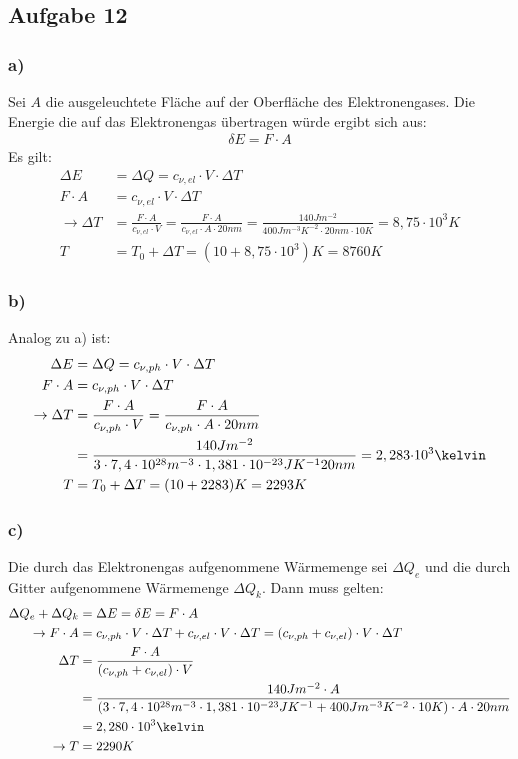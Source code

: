 \subsection*{Aufgabe 12}
\subsubsection*{a)}
Sei $A$ die ausgeleuchtete Fläche auf der Oberfläche des Elektronengases. Die Energie die auf das Elektronengas übertragen würde ergibt sich aus:
\begin{align*}
\delta E = F\cdot A
\end{align*}
Es gilt:
\begin{align*}
\Delta E &= \Delta Q= c_{\nu,el}\cdot V\cdot\Delta T\\
F\cdot A&= c_{\nu,el}\cdot V\cdot\Delta T\\
\rightarrow \Delta T &= \frac{F\cdot A}{c_{\nu,el}\cdot V} = \frac{F\cdot A}{c_{\nu,el}\cdot A\cdot \unit{20}{nm}} =  \frac{\unit{140}{Jm^{-2}}}{\unit{400}{Jm^{-3}K^{-2}}\cdot \unit{20}{nm}\cdot\unit{10}{K}} =8,75\cdot10^3K\\
T&=T_0+\Delta T = (10+8,75\cdot10^3)K = 8760K
\end{align*}

\subsubsection*{b)}
Analog zu a) ist:
\begin{align*}
\Delta E &= \Delta Q= c_{\nu,ph}\cdot V\cdot\Delta T\\
F\cdot A&= c_{\nu,ph}\cdot V\cdot\Delta T\\
\rightarrow \Delta T &= \frac{F\cdot A}{c_{\nu,ph}\cdot V} = \frac{F\cdot A}{c_{\nu,ph}\cdot A\cdot \unit{20}{nm}} \\
&=\frac{\unit{140}{Jm^{-2}}}{3 \cdot 7,4\cdot10^{28}\unit{}{m^{-3}}\cdot1,381\cdot10^{-23}\unit{}{JK^{-1}} \unit{20}{nm}}=
\unit{2,283}{\cdot 10^3}{\kelvin}\\
T&=T_0+\Delta T = (10+2283)K = 2293 K
\end{align*}
\subsubsection*{c)}
Die durch das Elektronengas aufgenommene Wärmemenge sei $\Delta Q_e$ und die durch Gitter aufgenommene Wärmemenge $\Delta Q_k$. Dann muss gelten:
\begin{align*}
\Delta Q_e+\Delta Q_k &= \Delta E = \delta E = F\cdot A\\
\rightarrow F\cdot A &=c_{\nu,ph}\cdot V\cdot\Delta T+c_{\nu,el}\cdot V\cdot\Delta T = (c_{\nu,ph}+c_{\nu,el})\cdot V\cdot\Delta T\\
\Delta T &= \frac{F\cdot A}{(c_{\nu,ph}+c_{\nu,el})\cdot V}\\
&= \frac{\unit{140}{Jm^{-2}}\cdot A}{(3 \cdot 7,4\cdot10^{28}\unit{}{m^{-3}}\cdot1,381\cdot10^{-23}\unit{}{JK^{-1}}+\unit{400}{Jm^{-3}K^{-2}}\cdot\unit{10}{K})\cdot A\cdot \unit{20}{nm}}\\
&= 2,280\cdot10^3\kelvin\\
\rightarrow T &= 2290 K
\end{align*}
